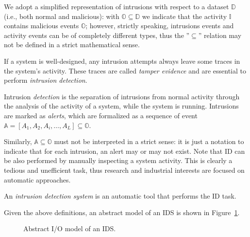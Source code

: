\begin{note}
  We adopt a simplified representation of intrusions with respect to a
  dataset $\mathbb{D}$ (i.e., both normal and malicious): with
  $\mathbb{O} \subseteq \mathbb{D}$ we indicate that the activity
  $\mathbb{I}$ contains malicious events $\mathbb{O}$; however,
  strictly speaking, intrusions events and activity events can be of
  completely different types, thus the ''$\subseteq$'' relation may
  not be defined in a strict mathematical sense.
\end{note}

\noindent If a system is well-designed, any intrusion attempts always
leave some traces in the system's activity. These traces are called
\emph{tamper evidence} and are essential to perform \emph{intrusion
detection}.

\begin{definition}
  Intrusion \emph{detection} is the separation of intrusions from
  normal activity through the analysis of the activity of a system,
  while the system is running. Intrusions are marked as \emph{alerts},
  which are formalized as a sequence of event $\mathbb{A} = [A_{1},
  A_{2}, A_{i}, \dots, A_{L}] \subseteq \mathbb{O}$.
\end{definition}

\noindent Similarly, $\mathbb{A} \subseteq \mathbb{O}$ must not be
interpreted in a strict sense: it is just a notation to indicate that
for each intrusion, an alert may or may not exist. Note that \ac{ID}
can be also performed by manually inspecting a system activity. This
is clearly a tedious and unefficient task, thus research and
industrial interests are focused on automatic approaches.

\begin{definition}
  An \emph{intrusion detection system} is an automatic tool that
  performs the \ac{ID} task.
\end{definition}

\noindent Given the above definitions, an abstract model of an
\ac{IDS} is shown in Figure~\ref{fig:ids-abstract-model}.

\begin{figure}[t]
  \centering
  \caption{Abstract I/O model of an \ac{IDS}.}
  \label{fig:ids-abstract-model}
\end{figure}

